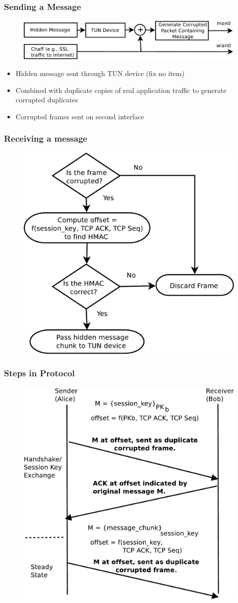 \documentclass{beamer}
\begin{document}
\begin{frame}
  \frametitle{Sending a Message}
  \begin{figure}
    \centering
    \includegraphics[width=.8\linewidth]{images/sender}
  \end{figure}
  \begin{itemize}
  \item Hidden message sent through TUN device (fix no item)
  \item Combined with duplicate copies of real application traffic to generate corrupted duplicates
  \item Corrupted frames sent on second interface
  \end{itemize}
\end{frame}

\begin{frame}
    \frametitle{Receiving a message}
  \begin{figure}
    \centering
  \includegraphics[width=.5\linewidth]{images/receiver}
  \end{figure}
\end{frame}

\begin{frame}
  \frametitle{Steps in Protocol}
  \begin{figure}
  \centering
  \includegraphics[width=.5\textwidth]{images/protocol}
  \end{figure}
\end{frame}
\end{document}
